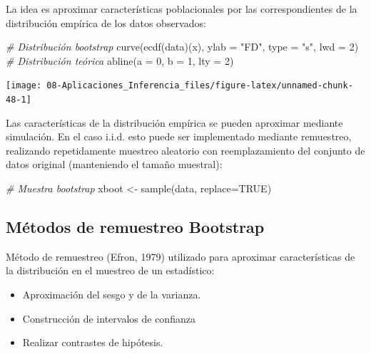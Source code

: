 \documentclass[
]{book}
\newenvironment{Shaded}{\begin{snugshade}}{\end{snugshade}}
\newcommand{\AttributeTok}[1]{\textcolor[rgb]{0.77,0.63,0.00}{#1}}
\newcommand{\CommentTok}[1]{\textcolor[rgb]{0.56,0.35,0.01}{\textit{#1}}}
\newcommand{\ConstantTok}[1]{\textcolor[rgb]{0.00,0.00,0.00}{#1}}
\newcommand{\DecValTok}[1]{\textcolor[rgb]{0.00,0.00,0.81}{#1}}
\newcommand{\FunctionTok}[1]{\textcolor[rgb]{0.00,0.00,0.00}{#1}}
\newcommand{\NormalTok}[1]{#1}
\newcommand{\OtherTok}[1]{\textcolor[rgb]{0.56,0.35,0.01}{#1}}
\newcommand{\StringTok}[1]{\textcolor[rgb]{0.31,0.60,0.02}{#1}}
\theoremstyle{break}
\theoremstyle{definition}
\theoremstyle{definition}
\theoremstyle{definition}
\theoremstyle{definition}
\theoremstyle{remark}
\begin{document}
La idea es aproximar características poblacionales por las correspondientes de la distribución empírica de los datos observados:

\begin{Shaded}
\begin{Highlighting}[]
 \CommentTok{\# Distribución bootstrap}
\FunctionTok{curve}\NormalTok{(}\FunctionTok{ecdf}\NormalTok{(data)(x), }\AttributeTok{ylab =} \StringTok{"FD"}\NormalTok{, }\AttributeTok{type =} \StringTok{"s"}\NormalTok{, }\AttributeTok{lwd =} \DecValTok{2}\NormalTok{)}
\CommentTok{\# Distribución teórica}
\FunctionTok{abline}\NormalTok{(}\AttributeTok{a =} \DecValTok{0}\NormalTok{, }\AttributeTok{b =} \DecValTok{1}\NormalTok{, }\AttributeTok{lty =} \DecValTok{2}\NormalTok{) }
\end{Highlighting}
\end{Shaded}

\begin{center}\texttt{[image: 08-Aplicaciones\_Inferencia\_files/figure-latex/unnamed-chunk-48-1]} \end{center}

Las características de la distribución empírica se pueden aproximar mediante simulación.
En el caso i.i.d. esto puede ser implementado mediante remuestreo,
realizando repetidamente muestreo aleatorio con reemplazamiento
del conjunto de datos original (manteniendo el tamaño muestral):

\begin{Shaded}
\begin{Highlighting}[]
 \CommentTok{\# Muestra bootstrap}
\NormalTok{xboot }\OtherTok{\textless{}{-}} \FunctionTok{sample}\NormalTok{(data, }\AttributeTok{replace=}\ConstantTok{TRUE}\NormalTok{)}
\end{Highlighting}
\end{Shaded}

\hypertarget{muxe9todos-de-remuestreo-bootstrap}{%
\subsection{Métodos de remuestreo Bootstrap}\label{muxe9todos-de-remuestreo-bootstrap}}

Método de remuestreo (Efron, 1979) utilizado para aproximar
características de la distribución en el muestreo de un estadístico:

\begin{itemize}
\item
  Aproximación del sesgo y de la varianza.
\item
  Construcción de intervalos de confianza
\item
  Realizar contrastes de hipótesis.
\end{itemize}
\end{document}
